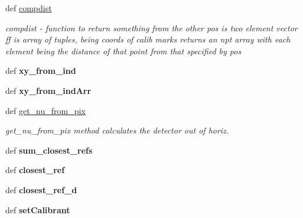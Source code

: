 \begin{DoxyCompactItemize}
\item 
\hypertarget{classmyDetector_1_1myDetector_a3870200120d08278f2f015534ca4557d}{def \hyperlink{classmyDetector_1_1myDetector_a3870200120d08278f2f015534ca4557d}{compdist}}\label{classmyDetector_1_1myDetector_a3870200120d08278f2f015534ca4557d}

\begin{DoxyCompactList}\small\item\em compdist -\/ function to return something from the other pos is two element vector ff is array of tuples, being coords of calib marks returns an npt array with each element being the distance of that point from that specified by pos \end{DoxyCompactList}\item 
\hypertarget{classmyDetector_1_1myDetector_aeef331d798559cfc9957b453c0db4f1d}{def {\bfseries xy\-\_\-from\-\_\-ind}}\label{classmyDetector_1_1myDetector_aeef331d798559cfc9957b453c0db4f1d}

\item 
\hypertarget{classmyDetector_1_1myDetector_a8fdf257dfc684bc53fead115ac4286dc}{def {\bfseries xy\-\_\-from\-\_\-ind\-Arr}}\label{classmyDetector_1_1myDetector_a8fdf257dfc684bc53fead115ac4286dc}

\item 
def \hyperlink{classmyDetector_1_1myDetector_ad6e7dc9869bfe3ee289ae5b417055781}{get\-\_\-nu\-\_\-from\-\_\-pix}
\begin{DoxyCompactList}\small\item\em get\-\_\-nu\-\_\-from\-\_\-pix method calculates the detector out of horiz. \end{DoxyCompactList}\item 
\hypertarget{classmyDetector_1_1myDetector_aee17546dae0f89430cdbd094e7f393bf}{def {\bfseries sum\-\_\-closest\-\_\-refs}}\label{classmyDetector_1_1myDetector_aee17546dae0f89430cdbd094e7f393bf}

\item 
\hypertarget{classmyDetector_1_1myDetector_af5b522628cb1f85f9e1f2bbc68237f87}{def {\bfseries closest\-\_\-ref}}\label{classmyDetector_1_1myDetector_af5b522628cb1f85f9e1f2bbc68237f87}

\item 
\hypertarget{classmyDetector_1_1myDetector_a7bddd4092e35f323d653b61deadfdae4}{def {\bfseries closest\-\_\-ref\-\_\-d}}\label{classmyDetector_1_1myDetector_a7bddd4092e35f323d653b61deadfdae4}

\item 
\hypertarget{classmyDetector_1_1myDetector_a0645faf5e285c133a284f12ba56d1f2c}{def {\bfseries set\-Calibrant}}\label{classmyDetector_1_1myDetector_a0645faf5e285c133a284f12ba56d1f2c}


\end{DoxyCompactItemize}
